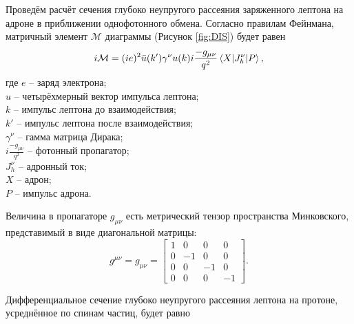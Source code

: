 \documentclass{extreport}
\begin{document}
Проведём расчёт сечения глубоко неупругого рассеяния заряженного лептона на адроне в приближении однофотонного обмена. Согласно правилам Фейнмана, матричный элемент $\mathcal{M}$ диаграммы (Рисунок \ref{fig:DIS}) будет равен
\begin{equation}
	i\mathcal{M} = (ie)^2 \bar{u}(k')\gamma^\nu u(k) i \frac{-g_{\mu\nu}}{q^2} \braket{X | J_h^\nu | P},
\end{equation}
где $e$ -- заряд электрона; \\ $u$ -- четырёхмерный вектор импульса лептона; \\ $k$ -- импульс лептона до взаимодействия; \\ $k'$ -- импульс лептона после взаимодействия; \\ $\gamma^\nu$ -- гамма матрица Дирака; \\ $i \frac{-g_{\mu\nu}}{q^2}$ -- фотонный пропагатор; \\ $ J_h^\nu $ -- адронный ток; \\ $X$ -- адрон; \\ $P$ -- импульс адрона. 

Величина в пропагаторе $g_{\mu\nu}$ есть метрический тензор пространства Минковского, представимый в виде диагональной матрицы:
\begin{equation}
	g^{\mu\nu} = g_{\mu\nu} = \begin{bmatrix} 1&0&0&0\\0&-1&0&0\\0&0&-1&0\\0&0&0&-1 \end{bmatrix}.
\end{equation}

Дифференциальное сечение глубоко неупругого рассеяния лептона на протоне, усреднённое по спинам частиц, будет равно
\end{document}
